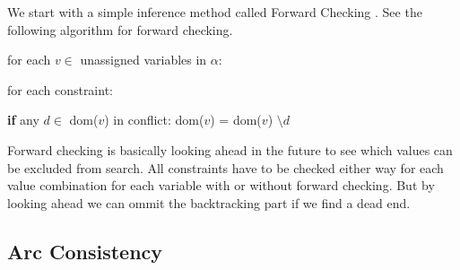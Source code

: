 We start with a simple inference method called Forward Checking \cite{forward_checking:1980}. See the following algorithm for forward checking.

\begin{tcolorbox}[title={function ForwardChecking($C, \alpha$)}]
	for each $v \in $ unassigned variables in $\alpha$:

	for each constraint:

	\textbf{if} any $d \in$ dom($v$) in conflict:
	dom($v$) = dom($v$) $\setminus d$
\end{tcolorbox}

Forward checking is basically looking ahead in the future to see which values can be excluded from search. All constraints have to be checked either way for each value combination for each variable with or without forward checking. But by looking ahead we can ommit the backtracking part if we find a dead end.

\subsection{Arc Consistency}


